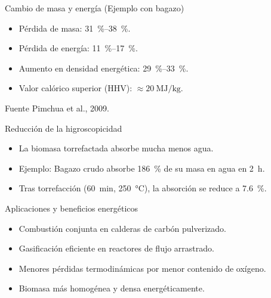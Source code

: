 \documentclass[main.tex]{subfiles}
\begin{document}
\begin{frame}{Cambio de masa y energía (Ejemplo con bagazo)}
  \begin{itemize}
    \item Pérdida de masa: \SIrange{31}{38}{\percent}.
    \item Pérdida de energía: \SIrange{11}{17}{\percent}.
    \item Aumento en densidad energética: \SIrange{29}{33}{\percent}.
    \item Valor calórico superior (HHV): $\approx \SI{20}{\mega\joule\per\kilogram}$.
  \end{itemize}
  \begin{block}{Fuente}
    \small Pimchua et al., 2009.
  \end{block}
\end{frame}

\begin{frame}{Reducción de la higroscopicidad}
  \begin{itemize}
    \item La biomasa torrefactada absorbe mucha menos agua.
    \item Ejemplo: Bagazo crudo absorbe \SI{186}{\percent} de su masa en agua en \SI{2}{\hour}.
    \item Tras torrefacción (\SI{60}{\minute}, \SI{250}{\celsius}), la absorción se reduce a \SI{7.6}{\percent}.
  \end{itemize}
  
  \begin{block}{Aplicaciones y beneficios energéticos}
    \begin{itemize}
      \item Combustión conjunta en calderas de carbón pulverizado.
      \item Gasificación eficiente en reactores de flujo arrastrado.
      \item Menores pérdidas termodinámicas por menor contenido de oxígeno.
      \item Biomasa más homogénea y densa energéticamente.
    \end{itemize}
  \end{block}
\end{frame}
\end{document}
